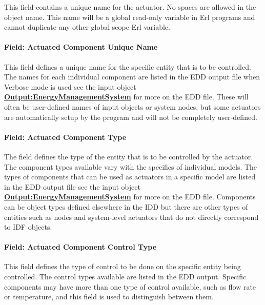 This field contains a unique name for the actuator. No spaces are allowed in the object name. This name will be a global read-only variable in Erl programs and cannot duplicate any other global scope Erl variable.

\paragraph{Field: Actuated Component Unique Name}\label{field-actuated-component-unique-name-000}

This field defines a unique name for the specific entity that is to be controlled. The names for each individual component are listed in the EDD output file when Verbose mode is used see the input object \textbf{\hyperref[outputenergymanagementsystem]{Output:EnergyManagementSystem}} for more on the EDD file. These will often be user-defined names of input objects or system nodes, but some actuators are automatically setup by the program and will not be completely user-defined.

\paragraph{Field: Actuated Component Type}\label{field-actuated-component-type-000}

The field defines the type of the entity that is to be controlled by the actuator. The component types available vary with the specifics of individual models. The types of components that can be used as actuators in a specific model are listed in the EDD output file see the input object \textbf{\hyperref[outputenergymanagementsystem]{Output:EnergyManagementSystem}} for more on the EDD file. Components can be object types defined elsewhere in the IDD but there are other types of entities such as nodes and system-level actuators that do not directly correspond to IDF objects.

\paragraph{Field: Actuated Component Control Type}\label{field-actuated-component-control-type-000}

This field defines the type of control to be done on the specific entity being controlled. The control types available are listed in the EDD output. Specific components may have more than one type of control available, such as flow rate or temperature, and this field is used to distinguish between them.

